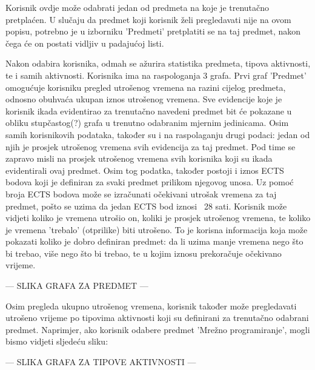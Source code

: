 \documentclass[times, utf8, zavrsni]{fer}
\begin{document}
Korisnik ovdje može odabrati jedan od predmeta na koje je trenutačno pretplaćen. U slučaju da predmet koji korisnik želi pregledavati nije na ovom popisu, potrebno je u izborniku 'Predmeti' pretplatiti se na taj predmet, nakon čega će on postati vidljiv u padajućoj listi.

Nakon odabira korisnika, odmah se ažurira statistika predmeta, tipova aktivnosti, te i samih aktivnosti. Korisnika ima na raspologanja 3 grafa. Prvi graf 'Predmet' omogućuje korisniku pregled utrošenog vremena na razini cijelog predmeta, odnosno obuhvaća ukupan iznos utrošenog vremena. Sve evidencije koje je korisnik ikada evidentirao za trenutačno navedeni predmet bit će pokazane u obliku stupčastog(?) grafa u trenutno odabranim mjernim jedinicama. Osim samih korisnikovih podataka, također su i na raspolaganju drugi podaci: jedan od njih je prosjek utrošenog vremena svih evidencija za taj predmet. Pod time se zapravo misli na prosjek utrošenog vremena svih korisnika koji su ikada evidentirali ovaj predmet. 
Osim tog podatka, također postoji i iznos ECTS bodova koji je definiran za svaki predmet prilikom njegovog unosa. Uz pomoć broja ECTS bodova može se izračunati očekivani utrošak vremena za taj predmet, pošto se uzima da jedan ECTS bod iznosi ~28 sati. Korisnik može vidjeti koliko je vremena utrošio on, koliki je prosjek utrošenog vremena, te koliko je vremena 'trebalo' (otprilike) biti utrošeno. To je korisna informacija koja može pokazati koliko je dobro definiran predmet: da li uzima manje vremena nego što bi trebao, više nego što bi trebao, te u kojim iznosu prekoračuje očekivano vrijeme.

--- SLIKA GRAFA ZA PREDMET ---

Osim pregleda ukupno utrošenog vremena, korisnik također može pregledavati utrošeno vrijeme po tipovima aktivnosti koji su definirani za trenutačno odabrani predmet. Naprimjer, ako korisnik odabere predmet 'Mrežno programiranje', mogli bismo vidjeti sljedeću sliku:

--- SLIKA GRAFA ZA TIPOVE AKTIVNOSTI ---
\end{document}
